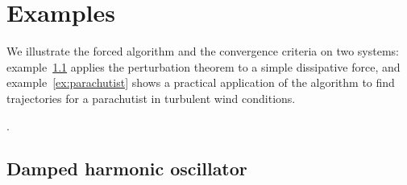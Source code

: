 \section{Examples}\label{sec:forced-examples}

We illustrate the forced algorithm and the convergence criteria on two systems: example~\ref{ex:damped-oscillator} applies the perturbation theorem to a simple dissipative force, and example~\ref{ex:parachutist} shows a practical application of the algorithm to find trajectories for a parachutist in turbulent wind conditions.

\sourceandrepo{}.

\tocless\subsection{Damped harmonic oscillator}\label{ex:damped-oscillator}

